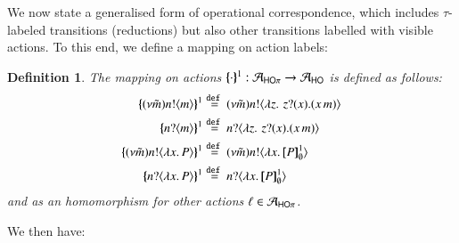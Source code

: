 \documentclass[preprint,11pt]{elsarticle}
\newtheorem{definition}{Definition}[section]
\begin{document}
{{%
We now state a generalised form of operational correspondence, which includes $\tau$-labeled transitions (reductions) but also other transitions labelled with visible actions.
To this end, we define a mapping  on action labels: 
\begin{definition}\rm
 The mapping on actions $\{\!\!\{\cdot\}\!\!\}^{1}: \mathcal{A}_{\mathsf{HO}\pi} \to \mathcal{A}_{\mathsf{HO}}$
	is defined as follows:
	\begin{align*}
		\mapa{(\nu \tilde{m})\bactout{n}{m}}^{1}
		& \defeq
		(\nu \tilde{m})\bactout{n}{\abs{z}{\,\binp{z}{x} (\appl{x}{m})} }
		\\
		\mapa{\bactinp{n}{m}}^{1}
		& \defeq
		\bactinp{n}{\abs{z}{\,\binp{z}{x} (\appl{x}{m})} }
		\\
		\mapa{(\nu \tilde{m})\bactout{n}{\abs{{x}}{P}}}^{1}
		& \defeq
		(\nu \tilde{m})\bactout{n}{\abs{{x}}{\pmapp{P}{1}{\es}}}
		\\ 
		\mapa{\bactinp{n}{\abs{{x}}{P}}}^{1}
		& \defeq
		\bactinp{n}{\abs{{x}}{\pmapp{P}{1}{\es}}}
	\end{align*}
	and as an homomorphism for other actions $\ell \in \mathcal{A}_{\mathsf{HO}\pi}$.
	\end{definition}
	
	We then have:


}}
\end{document}

